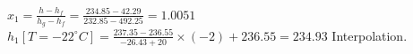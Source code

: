 \( x_1 = \frac{h - h_f}{h_g - h_f} = \frac{234.85 - 42.29}{232.85 - 492.25} = 1.0051 \)  
\( h_1[T = -22^\circ C] = \frac{237.35 - 236.55}{-26.43 + 20} \times (-2) + 236.55 = 234.93 \)  
Interpolation.